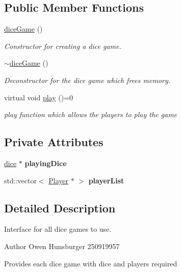 \subsection*{Public Member Functions}
\begin{DoxyCompactItemize}
\item 
\hyperlink{classdiceGame_ae964394c63494b6ceb6403e7a66aa4b2}{dice\+Game} ()
\begin{DoxyCompactList}\small\item\em Constructor for creating a dice game. \end{DoxyCompactList}\item 
\hyperlink{classdiceGame_a33c18d6e62bb7599befc405ecbb21402}{$\sim$dice\+Game} ()
\begin{DoxyCompactList}\small\item\em Deconstructor for the dice game which frees memory. \end{DoxyCompactList}\item 
virtual void \hyperlink{classdiceGame_a0620d98347df4779fa620b3b3e239d4e}{play} ()=0
\begin{DoxyCompactList}\small\item\em play function which allows the players to play the game \end{DoxyCompactList}\end{DoxyCompactItemize}
\subsection*{Private Attributes}
\begin{DoxyCompactItemize}
\item 
\mbox{\label{classdiceGame_a3a3719c16a28497eba3a36edc73119ad}} 
\hyperlink{classdice}{dice} $\ast$ {\bfseries playing\+Dice}
\item 
\mbox{\label{classdiceGame_ae67da3cda73d2b5a90bb0ed9365c2b8b}} 
std\+::vector$<$ \hyperlink{classPlayer}{Player} $\ast$ $>$ {\bfseries player\+List}
\end{DoxyCompactItemize}


\subsection{Detailed Description}
Interface for all dice games to use. 

\begin{DoxyAuthor}{Author}
Owen Hunsburger 250919957
\end{DoxyAuthor}
Provides each dice game with dice and players required 

